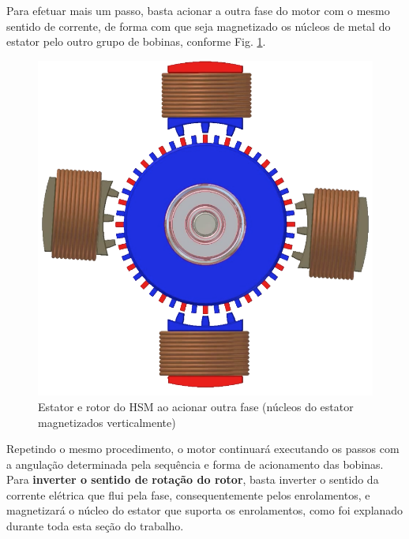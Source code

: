 	Para efetuar mais um passo, basta acionar a outra fase do motor com o mesmo sentido de corrente, de forma com que seja magnetizado os núcleos de metal do estator pelo outro grupo de bobinas, conforme Fig. \ref{acionamento2}.
	
	\begin{figure}[H]
		\centering 
		\includegraphics[scale=0.25]{images/hsm_operation/etapa2}
		\caption{Estator e rotor do HSM ao acionar outra fase (núcleos do estator magnetizados verticalmente)}
		\label{acionamento2}
	\end{figure}
	
	Repetindo o mesmo procedimento, o motor continuará executando os passos com a angulação determinada pela sequência e forma de acionamento das bobinas. Para \textbf{inverter o sentido de rotação do rotor}, basta inverter o sentido da corrente elétrica que flui pela fase, consequentemente pelos enrolamentos, e magnetizará o núcleo do estator que suporta os enrolamentos, como foi explanado durante toda esta seção do trabalho. 
	